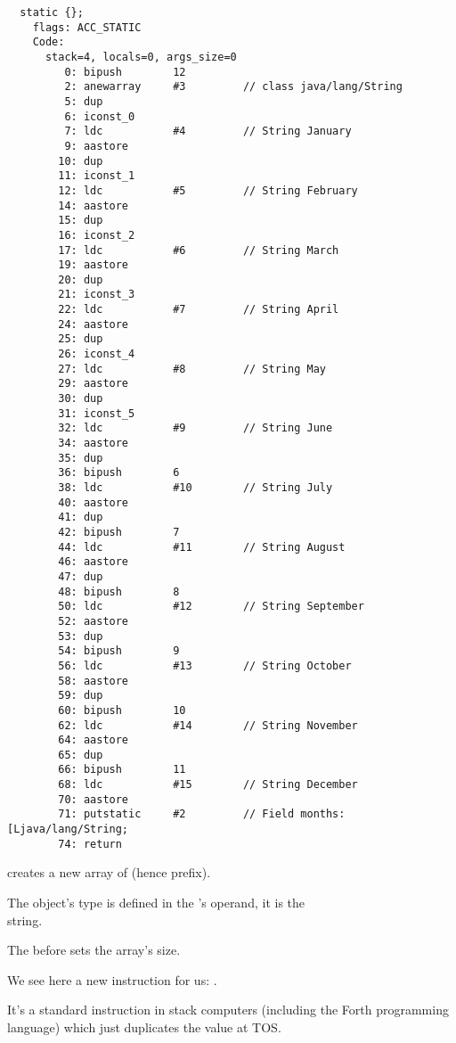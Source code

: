 \begin{lstlisting}
  static {};
    flags: ACC_STATIC
    Code:
      stack=4, locals=0, args_size=0
         0: bipush        12
         2: anewarray     #3         // class java/lang/String
         5: dup           
         6: iconst_0      
         7: ldc           #4         // String January
         9: aastore       
        10: dup           
        11: iconst_1      
        12: ldc           #5         // String February
        14: aastore       
        15: dup           
        16: iconst_2      
        17: ldc           #6         // String March
        19: aastore       
        20: dup           
        21: iconst_3      
        22: ldc           #7         // String April
        24: aastore       
        25: dup           
        26: iconst_4      
        27: ldc           #8         // String May
        29: aastore       
        30: dup           
        31: iconst_5      
        32: ldc           #9         // String June
        34: aastore       
        35: dup           
        36: bipush        6
        38: ldc           #10        // String July
        40: aastore       
        41: dup           
        42: bipush        7
        44: ldc           #11        // String August
        46: aastore       
        47: dup           
        48: bipush        8
        50: ldc           #12        // String September
        52: aastore       
        53: dup           
        54: bipush        9
        56: ldc           #13        // String October
        58: aastore       
        59: dup           
        60: bipush        10
        62: ldc           #14        // String November
        64: aastore       
        65: dup           
        66: bipush        11
        68: ldc           #15        // String December
        70: aastore       
        71: putstatic     #2         // Field months:[Ljava/lang/String;
        74: return        
\end{lstlisting}

 creates a new array of  (hence  prefix).

The object's type is defined in the 's operand, it is the \\
 string.

The  before  sets the array's size.

We see here a new instruction for us: .


It's a standard instruction in stack computers (including the Forth programming language) 
which just duplicates the value at \ac{TOS}.

